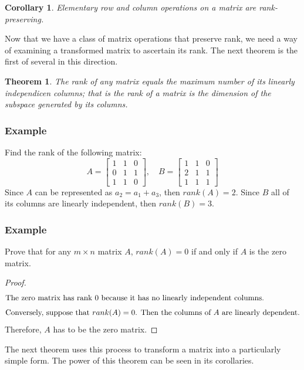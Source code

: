\documentclass[10pt, oneside]{article}
\newtheorem{thm}{Theorem}
\newtheorem{cor}{Corollary}
\begin{document}
\begin{cor}
	Elementary row and column operations on a matrix are rank-preserving.
\end{cor}

Now that we have a class of matrix operations that preserve rank, we need a way of examining a transformed matrix to ascertain its rank. The next theorem
is the first of several in this direction.

\begin{thm}
	The rank of any matrix equals the maximum number of its linearly independicen columns; that is the rank of a matrix is the dimension of the subspace generated by its columns.
\end{thm}

\subsubsection{Example}
Find the rank of the following matrix:
\[
	A = \begin{bmatrix} 1 & 1 & 0 \\ 0 & 1 & 1 \\ 1 & 1 & 0 \end{bmatrix}, \quad B = \begin{bmatrix} 1 & 1 & 0 \\ 2 & 1 & 1 \\ 1 & 1 & 1 \end{bmatrix}
\]
Since $A$ can be represented as $a_2 = a_1 + a_3$, then $rank(A) = 2$. Since $B$ all of its columns are linearly independent, then $rank(B) = 3$.
\subsubsection{Example}
Prove that for any $m \times n$ matrix $A$, $rank(A) = 0$ if and only if $A$ is the zero matrix.

\begin{proof}
	\begin{align*}
		\intertext{The zero matrix has rank 0 because it has no linearly independent columns.}
		\intertext{Conversely, suppose that $rank(A) = 0$. Then the columns of $A$ are linearly dependent.}
	\end{align*}
	Therefore, $A$ has to be the zero matrix.
\end{proof}

The next theorem uses this process to transform a matrix into a particularly simple form. The power of this theorem can be seen in its corollaries.
\end{document}
